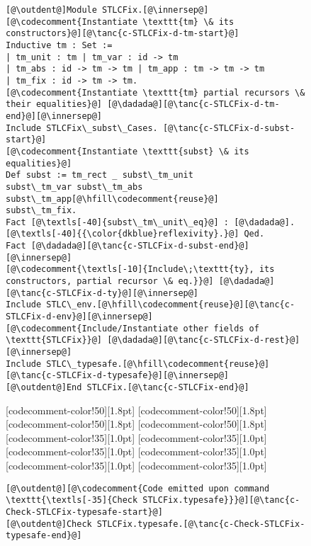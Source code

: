 \begin{figure}
\begin{minipage}{\textwidth}
\begin{multicols}{2}
\begin{lstlisting}
[@\outdent@]Module STLCFix.[@\innersep@]
[@\codecomment{Instantiate \texttt{tm} \& its constructors}@][@\tanc{c-STLCFix-d-tm-start}@]
Inductive tm : Set :=
| tm_unit : tm | tm_var : id -> tm
| tm_abs : id -> tm -> tm | tm_app : tm -> tm -> tm
| tm_fix : id -> tm -> tm.
[@\codecomment{Instantiate \texttt{tm} partial recursors \& their equalities}@] [@\dadada@][@\tanc{c-STLCFix-d-tm-end}@][@\innersep@]
Include STLCFix\_subst\_Cases. [@\tanc{c-STLCFix-d-subst-start}@]
[@\codecomment{Instantiate \texttt{subst} \& its equalities}@]
Def subst := tm_rect _ subst\_tm_unit
subst\_tm_var subst\_tm_abs subst\_tm_app[@\hfill\codecomment{reuse}@]
subst\_tm_fix.
Fact [@\textls[-40]{subst\_tm\_unit\_eq}@] : [@\dadada@]. [@\textls[-40]{{\color{dkblue}reflexivity}.}@] Qed.
Fact [@\dadada@][@\tanc{c-STLCFix-d-subst-end}@][@\innersep@]
[@\codecomment{\textls[-10]{Include\;\texttt{ty}, its constructors, partial recursor \& eq.}}@] [@\dadada@][@\tanc{c-STLCFix-d-ty}@][@\innersep@]
Include STLC\_env.[@\hfill\codecomment{reuse}@][@\tanc{c-STLCFix-d-env}@][@\innersep@]
[@\codecomment{Include/Instantiate other fields of \texttt{STLCFix}}@] [@\dadada@][@\tanc{c-STLCFix-d-rest}@][@\innersep@]
Include STLC\_typesafe.[@\hfill\codecomment{reuse}@][@\tanc{c-STLCFix-d-typesafe}@][@\innersep@]
[@\outdent@]End STLCFix.[@\tanc{c-STLCFix-end}@]
\end{lstlisting}

[codecomment-color!50][1.8pt]
[codecomment-color!50][1.8pt]
[codecomment-color!50][1.8pt]
[codecomment-color!50][1.8pt]
[codecomment-color!35][1.0pt]
[codecomment-color!35][1.0pt]
[codecomment-color!35][1.0pt]
[codecomment-color!35][1.0pt]
[codecomment-color!35][1.0pt]
[codecomment-color!35][1.0pt]

\vspace{-3pt}


\begin{lstlisting}
[@\outdent@][@\codecomment{Code emitted upon command \texttt{\textls[-35]{Check STLCFix.typesafe}}}@][@\tanc{c-Check-STLCFix-typesafe-start}@]
[@\outdent@]Check STLCFix.typesafe.[@\tanc{c-Check-STLCFix-typesafe-end}@]
\end{lstlisting}


\end{multicols}
\end{minipage}
\end{figure}
